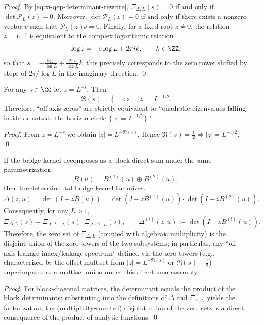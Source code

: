 \begin{proof}
By \eqref{eq:xi-qep-determinant-rewrite}, \(\Xi_{\Delta,L}(s)=0\) if and only if \(\det \mathcal{P}_L(z)=0\).
Moreover, \(\det \mathcal{P}_L(z)=0\) if and only if there exists a nonzero vector \(v\) such that \(\mathcal{P}_L(z)v=0\).
Finally, for a fixed root \(z\neq 0\), the relation \(z=L^{-s}\) is equivalent to the complex logarithmic relation
\[
\log z=-s\log L+2\pi i k,\qquad k\in\ZZ,
\]
so that
\(
s=-\frac{\log z}{\log L}+\frac{2\pi i}{\log L}k
\);
this precisely corresponds to the zero tower shifted by steps of \(2\pi/\log L\) in the imaginary direction. \qed
\end{proof}

\begin{corollary}\label{cor:xi-critical-line-horizon-circle}
For any \(s\in\CC\) let \(z=L^{-s}\). Then
\[
\Re(s)=\tfrac12\quad\Longleftrightarrow\quad |z|=L^{-1/2}.
\]
Therefore, ``off-axis zeros'' are strictly equivalent to ``quadratic eigenvalues falling inside or outside the horizon circle \(\{ |z|=L^{-1/2}\}\).''
\end{corollary}

\begin{proof}
From \(z=L^{-s}\) we obtain \(|z|=L^{-\Re(s)}\).
Hence \(\Re(s)=\tfrac12\iff |z|=L^{-1/2}\). \qed
\end{proof}

\begin{corollary}\label{cor:xi-leakage-additivity-directsum}
If the bridge kernel decomposes as a block direct sum under the same parametrization
\[
B(u)=B^{(1)}(u)\oplus B^{(2)}(u),
\]
then the determinantal bridge kernel factorizes:
\[
\Delta(z,u)=\det(I-zB(u))=\det(I-zB^{(1)}(u))\cdot \det(I-zB^{(2)}(u)).
\]
Consequently, for any \(L>1\),
\[
\Xi_{\Delta,L}(s)=\Xi_{\Delta^{(1)},L}(s)\cdot \Xi_{\Delta^{(2)},L}(s),
\qquad
\Delta^{(i)}(z,u):=\det(I-zB^{(i)}(u)).
\]
Therefore, the zero set of \(\Xi_{\Delta,L}\) (counted with algebraic multiplicity) is the disjoint union of the zero towers of the two subsystems; in particular, any ``off-axis leakage index/leakage spectrum'' defined via the zero towers (e.g., characterized by the offset multiset from \(|z|=L^{-\Re(s)}\) or \(\Re(s)-\tfrac12\)) superimposes as a multiset union under this direct sum assembly.
\end{corollary}
\begin{proof}
For block-diagonal matrices, the determinant equals the product of the block determinants; substituting into the definitions of \(\Delta\) and \(\Xi_{\Delta,L}\) yields the factorization; the (multiplicity-counted) disjoint union of the zero sets is a direct consequence of the product of analytic functions. \qed
\end{proof}


